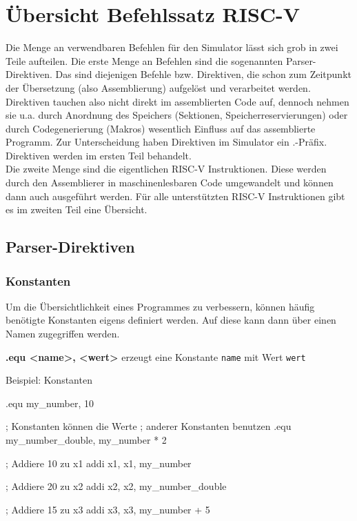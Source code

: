 
\section{Übersicht Befehlssatz RISC-V}

Die Menge an verwendbaren Befehlen für den Simulator lässt sich grob in zwei
Teile aufteilen. Die erste Menge an Befehlen sind die sogenannten
Parser-Direktiven. Das sind diejenigen Befehle bzw. Direktiven, die schon zum
Zeitpunkt der Übersetzung (also Assemblierung) aufgelöst und verarbeitet werden.
Direktiven tauchen also nicht direkt im assemblierten Code auf, dennoch nehmen
sie u.a. durch Anordnung des Speichers (Sektionen, Speicherreservierungen) oder
durch Codegenerierung (Makros) wesentlich Einfluss auf das assemblierte
Programm. Zur Unterscheidung haben Direktiven im Simulator ein .-Präfix.
Direktiven werden im ersten Teil behandelt.\\
Die zweite Menge sind die eigentlichen RISC-V Instruktionen. Diese werden durch
den Assemblierer in maschinenlesbaren Code umgewandelt und können dann auch
ausgeführt werden. Für alle unterstützten RISC-V Instruktionen gibt es im
zweiten Teil eine Übersicht.

\subsection{Parser-Direktiven}

\subsubsection{Konstanten}
Um die Übersichtlichkeit eines Programmes zu verbessern, können häufig benötigte
Konstanten eigens definiert werden. Auf diese kann dann über einen Namen
zugegriffen werden.

\textbf{.equ <name>, <wert>} erzeugt eine Konstante \texttt{name} mit Wert
\texttt{wert}

\begin{exampleblock}{Beispiel: Konstanten}
	\begin{riscv}
	.equ my_number, 10

	; Konstanten können die Werte
	; anderer Konstanten benutzen
	.equ my_number_double, my_number * 2

	; Addiere 10 zu x1
	addi x1, x1, my_number

	; Addiere 20 zu x2
	addi x2, x2, my_number_double

	; Addiere 15 zu x3
	addi x3, x3, my_number + 5
	\end{riscv}
\end{exampleblock}

